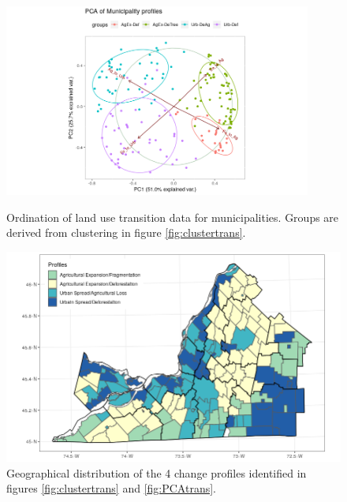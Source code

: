 \begin{figure}[h!]
  \centering
    \includegraphics[width=0.9\textwidth]{thesis/figures/PCA_trans_profiles.png}
  \caption{Ordination of land use transition data for municipalities. Groups are derived from clustering in figure \ref{fig:clustertrans}.}
  \label{fig:PCAtrans}

  \centering
    \includegraphics[width=\textwidth]{thesis/figures/transition_prof_map.png}
  \caption{Geographical distribution of the 4 change profiles identified in figures \ref{fig:clustertrans} and \ref{fig:PCAtrans}.}
  \label{fig:maptrans}
\end{figure}

\clearpage



